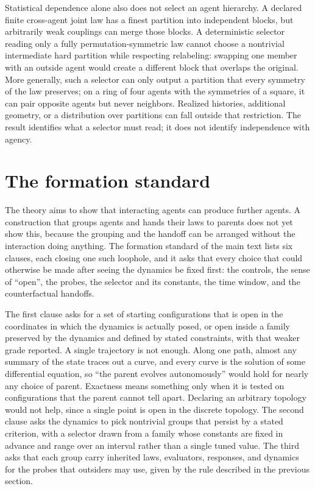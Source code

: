 Statistical dependence alone also does not select an agent hierarchy. A declared finite cross-agent joint law has a finest partition into independent blocks, but arbitrarily weak couplings can merge those blocks. A deterministic selector reading only a fully permutation-symmetric law cannot choose a nontrivial intermediate hard partition while respecting relabeling: swapping one member with an outside agent would create a different block that overlaps the original. More generally, such a selector can only output a partition that every symmetry of the law preserves; on a ring of four agents with the symmetries of a square, it can pair opposite agents but never neighbors. Realized histories, additional geometry, or a distribution over partitions can fall outside that restriction. The result identifies what a selector must read; it does not identify independence with agency.

\section{The formation standard}

The theory aims to show that interacting agents can produce further agents.
A construction that groups agents and hands their laws to parents does not
yet show this, because the grouping and the handoff can be arranged without
the interaction doing anything. The formation standard of the main text
lists six clauses, each closing one such loophole, and it asks that every
choice that could otherwise be made after seeing the dynamics be fixed
first: the controls, the sense of ``open'', the probes, the selector and its
constants, the time window, and the counterfactual handoffs.

The first clause asks for a set of starting configurations that is open in
the coordinates in which the dynamics is actually posed, or open inside a
family preserved by the dynamics and defined by stated constraints, with
that weaker grade reported. A single trajectory is not enough. Along one
path, almost any summary of the state traces out a curve, and every curve is
the solution of some differential equation, so ``the parent evolves
autonomously'' would hold for nearly any choice of parent. Exactness means
something only when it is tested on configurations that the parent cannot
tell apart. Declaring an arbitrary topology would not help, since a single
point is open in the discrete topology. The second clause asks the dynamics
to pick nontrivial groups that persist by a stated criterion, with a
selector drawn from a family whose constants are fixed in advance and range
over an interval rather than a single tuned value. The third asks that each
group carry inherited laws, evaluators, responses, and dynamics for the
probes that outsiders may use, given by the rule described in the previous
section.

